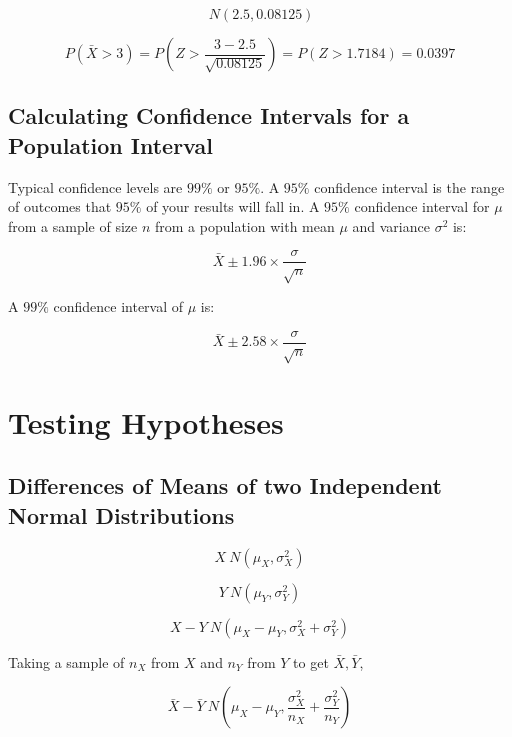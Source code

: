\documentclass{article}
\begin{document}
\[~ N\left(2.5, 0.08125\right)\]

\[P\left(\bar{X} > 3\right) = P\left(Z > \frac{3 - 2.5}{\sqrt{0.08125}}\right) =
P\left(Z > 1.7184\right) = 0.0397\]

\subsection{Calculating Confidence Intervals for a Population Interval}

Typical confidence levels are $99\%$ or $95\%$. A $95\%$ confidence interval is
the range of outcomes that $95\%$ of your results will fall in. A $95\%$
confidence interval for $\mu$ from a sample of size $n$ from a population with
mean $\mu$ and variance $\sigma^2$ is:

\[\bar{X} \pm 1.96 \times \frac{\sigma}{\sqrt{n}}\]

\noindent A $99\%$ confidence interval of $\mu$ is:

\[\bar{X} \pm 2.58 \times \frac{\sigma}{\sqrt{n}}\]

\begin{figure}
    
    \begin{tikzpicture}

    \end{tikzpicture}

\end{figure}

\section{Testing Hypotheses}

\subsection{Differences of Means of two Independent Normal Distributions}

\[X ~ N\left(\mu_X, \sigma_X^2\right)\]

\[Y ~ N\left(\mu_Y, \sigma_Y^2\right)\]

\[X - Y ~ N\left(\mu_X - \mu_Y, \sigma_X^2 + \sigma_Y^2\right)\]

\noindent Taking a sample of $n_X$ from $X$ and $n_Y$ from $Y$ to get $\bar{X},
\bar{Y}$,

\begin{equation}\bar{X} - \bar{Y} ~ N\left(\mu_X - \mu_Y, \frac{\sigma_X^2}{n_X} +
\frac{\sigma_Y^2}{n_Y}\right)\end{equation}
\end{document}
